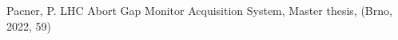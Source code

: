 {\begin{thebibliography}{99}
        Pacner, P. LHC Abort Gap Monitor
            Acquisition System, Master thesis, (Brno, 2022, 59)




% 

    \end{thebibliography}
} %
